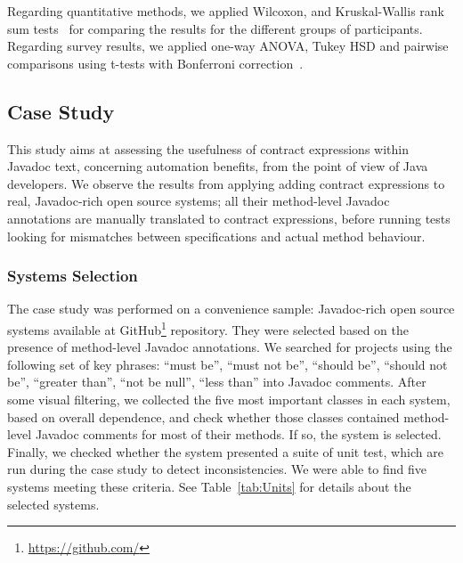 Regarding quantitative methods, we applied Wilcoxon, and Kruskal-Wallis rank sum tests~\cite{statistical} for comparing the results for the different groups of participants. Regarding survey results, we applied one-way ANOVA, Tukey HSD and pairwise comparisons using t-tests with Bonferroni correction~\cite{statistical}.%

\subsection{Case Study}
\label{sec:caseStudy}
This study aims at assessing the usefulness of contract expressions within Javadoc text, concerning automation benefits, from the point of view of Java developers. 
We observe the results from applying adding contract expressions to \totalSystems{} real, Javadoc-rich open source systems; all their method-level Javadoc annotations are manually translated to contract expressions, before running tests looking for mismatches between specifications and actual method behaviour.

\subsubsection{Systems Selection} 
\label{sec:systems}

The case study was performed on a convenience sample: \totalSystems{} Javadoc-rich open source systems available at GitHub\footnote{\url{https://github.com/}} repository.
They were selected based on the presence of method-level Javadoc annotations. 
We searched for projects using the following set of key phrases: ``must be'', ``must not be'', ``should
be'', ``should not be'', ``greater than'', ``not be null'', ``less than'' into Javadoc
comments.
After some visual filtering, we collected the five most important classes in
each system, based on overall dependence, and check whether those classes
contained method-level Javadoc comments for most of their methods. If so, the
system is selected. Finally, we checked whether the system presented a suite of
unit test, which are run during the case study to detect inconsistencies. We
were able to find five systems meeting these criteria.
See Table~\ref{tab:Units} for details about the selected systems. 

